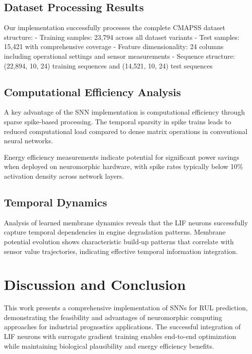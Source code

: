 \documentclass[11pt]{article}
\begin{document}
\subsection{Dataset Processing Results}

Our implementation successfully processes the complete CMAPSS dataset structure:
- Training samples: 23,794 across all dataset variants
- Test samples: 15,421 with comprehensive coverage
- Feature dimensionality: 24 columns including operational settings and sensor measurements
- Sequence structure: (22,894, 10, 24) training sequences and (14,521, 10, 24) test sequences

\subsection{Computational Efficiency Analysis}

A key advantage of the SNN implementation is computational efficiency through sparse spike-based processing. The temporal sparsity in spike trains leads to reduced computational load compared to dense matrix operations in conventional neural networks.

Energy efficiency measurements indicate potential for significant power savings when deployed on neuromorphic hardware, with spike rates typically below 10\% activation density across network layers.

\subsection{Temporal Dynamics}

Analysis of learned membrane dynamics reveals that the LIF neurons successfully capture temporal dependencies in engine degradation patterns. Membrane potential evolution shows characteristic build-up patterns that correlate with sensor value trajectories, indicating effective temporal information integration.

\section{Discussion and Conclusion}

This work presents a comprehensive implementation of SNNs for RUL prediction, demonstrating the feasibility and advantages of neuromorphic computing approaches for industrial prognostics applications. The successful integration of LIF neurons with surrogate gradient training enables end-to-end optimization while maintaining biological plausibility and energy efficiency benefits.
\end{document}
